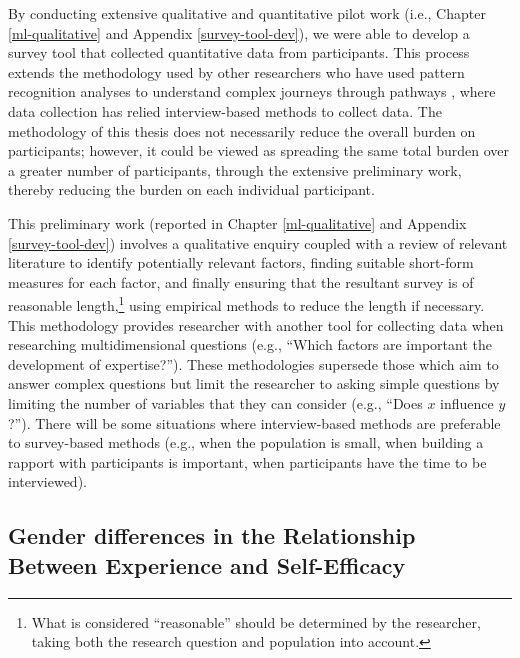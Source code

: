 \documentclass[
  12pt,
  a4paper,
]{book}
\begin{document}
By conducting extensive qualitative and quantitative pilot work (i.e., Chapter \ref{ml-qualitative} and Appendix \ref{survey-tool-dev}), we were able to develop a survey tool that collected quantitative data from participants. This process extends the methodology used by other researchers who have used pattern recognition analyses to understand complex journeys through pathways \citep[e.g.,][]{Jones2019a, Jones2020, Gullich2019}, where data collection has relied interview-based methods to collect data. The methodology of this thesis does not necessarily reduce the overall burden on participants; however, it could be viewed as spreading the same total burden over a greater number of participants, through the extensive preliminary work, thereby reducing the burden on each individual participant.

This preliminary work (reported in Chapter \ref{ml-qualitative} and Appendix \ref{survey-tool-dev}) involves a qualitative enquiry coupled with a review of relevant literature to identify potentially relevant factors, finding suitable short-form measures for each factor, and finally ensuring that the resultant survey is of reasonable length,\footnote{What is considered ``reasonable'' should be determined by the researcher, taking both the research question and population into account.} using empirical methods to reduce the length if necessary. This methodology provides researcher with another tool for collecting data when researching multidimensional questions (e.g., ``Which factors are important the development of expertise?''). These methodologies supersede those which aim to answer complex questions but limit the researcher to asking simple questions by limiting the number of variables that they can consider (e.g., ``Does \(x\) influence \(y\)?''). There will be some situations where interview-based methods are preferable to survey-based methods (e.g., when the population is small, when building a rapport with participants is important, when participants have the time to be interviewed).

\hypertarget{gender-differences-in-the-relationship-between-experience-and-self-efficacy}{%
\subsection{Gender differences in the Relationship Between Experience and Self-Efficacy}\label{gender-differences-in-the-relationship-between-experience-and-self-efficacy}}
\end{document}
